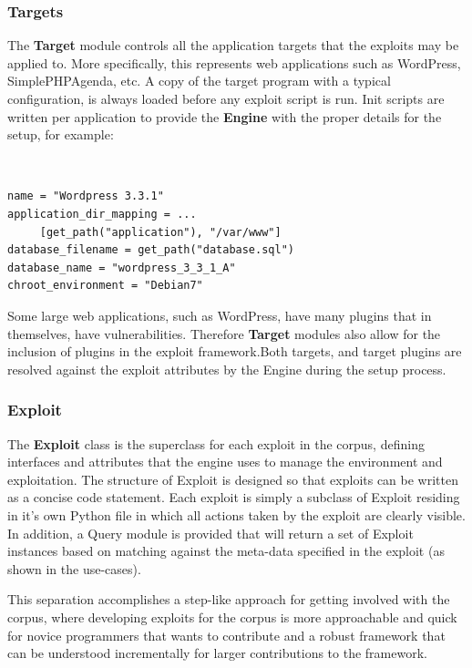 \documentclass[letterpaper,twocolumn,10pt]{article}
\begin{document}
\subsubsection{Targets}
   The {\bf Target} module controls all the application targets that the exploits may be applied to.  More specifically, this represents web applications such as WordPress, SimplePHPAgenda, etc. A copy of the target program with a typical configuration, is always loaded before any exploit script is run.  Init scripts are written per application to provide the {\bf Engine} with the proper details for the setup, for example:

\begin{minipage}{\textwidth}
{\tt \footnotesize
\begin{lstlisting}
name = "Wordpress 3.3.1"
application_dir_mapping = ...
     [get_path("application"), "/var/www"]
database_filename = get_path("database.sql")
database_name = "wordpress_3_3_1_A"
chroot_environment = "Debian7"
\end{lstlisting}
} 
\end{minipage}


Some large web applications, such as WordPress, have many plugins that in themselves, have vulnerabilities. Therefore {\bf Target} modules also allow for the inclusion of plugins in the exploit framework.Both targets, and target plugins are resolved against the exploit attributes by the Engine during the setup process. 


\subsubsection{Exploit}
The {\bf Exploit} class is the superclass for each exploit in the corpus, defining interfaces and attributes that the engine uses to manage the environment and exploitation. The structure of Exploit is designed so that exploits can be written as a concise code statement. Each exploit is simply a subclass of Exploit residing in it's own Python file in which all actions taken by the exploit are clearly visible. In addition, a Query module is provided that will return a set of Exploit instances based on matching against the meta-data specified in the exploit (as shown in the use-cases).\par

This separation accomplishes a step-like approach for getting involved with the corpus, where developing exploits for the corpus is more approachable and quick for novice programmers that wants to contribute and a robust framework that can be understood incrementally for larger contributions to the framework.\par
 
\end{document}
